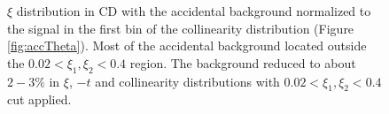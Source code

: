 \begin{enumerate}
\begin{figure}[H]
{\begin{subfigure}[b]{\linewidth}{
				}
		\end{subfigure}
	}
	\parbox{0.48\textwidth}{
		\centering
		\begin{subfigure}[b]{\linewidth}{
				}
		\end{subfigure}
	}
	\quad
	\parbox{0.48\textwidth}{
		\centering
		\begin{subfigure}[b]{\linewidth}{
				}
		\end{subfigure}
	}
	\caption[x]{$\xi$ distribution in CD with the accidental background normalized to the signal in the first bin of the collinearity distribution (Figure \ref{fig:accTheta}). Most of the accidental background located outside the $0.02<\xi_1,\xi_2<0.4$ region. The background reduced to about $2-3\%$ in $\xi$, $-t$ and collinearity distributions with $0.02<\xi_1,\xi_2<0.4$ cut applied.}
	\label{fig:xecCutAcc}
\end{figure}
\end{enumerate}
